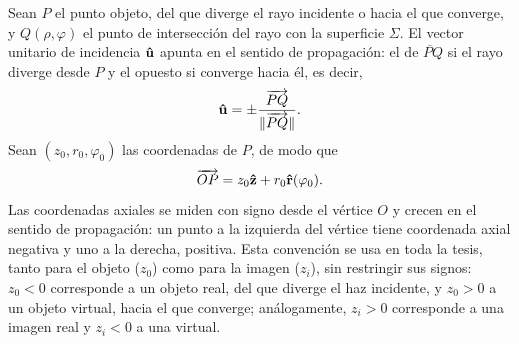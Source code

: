 Sean $P$ el punto objeto, del que diverge el rayo incidente o hacia el que converge, y $Q(\rho, \varphi)$ el punto de intersección del rayo con la superficie $\Sigma$. El vector unitario de incidencia $\bm{\hat{\mathbf{u}}}$ apunta en el sentido de propagación: el de $\lvec{PQ}$ si el rayo diverge desde $P$ y el opuesto si converge hacia él, es decir,
\begin{equation}
  \bm{\hat{\mathbf{u}}} = \pm\frac{\overrightarrow{PQ}}{\lVert \overrightarrow{PQ} \rVert}.
  \label{eq:def_of_u}
\end{equation}
Sean $(z_0, r_0, \varphi_0)$ las coordenadas de $P$, de modo que
\begin{equation}
  \overrightarrow{OP} = z_0\bm{\hat{\mathbf{z}}} + r_0 \bm{\hat{\mathbf{r}}}(\varphi_0).
  \label{eq:def_OP_where_P_is_any_point_of_space}
\end{equation}
Las coordenadas axiales se miden con signo desde el vértice $O$ y crecen en el
sentido de propagación: un punto a la izquierda del vértice tiene coordenada
axial negativa y uno a la derecha, positiva. Esta convención se usa en toda la
tesis, tanto para el objeto ($z_0$) como para la imagen ($z_i$), sin
restringir sus signos: $z_0<0$ corresponde a un objeto real, del que diverge
el haz incidente, y $z_0>0$ a un objeto virtual, hacia el que converge;
análogamente, $z_i>0$ corresponde a una imagen real y $z_i<0$ a una virtual.

